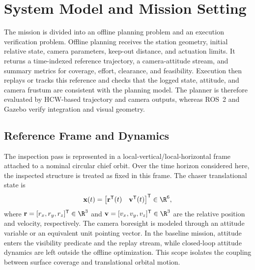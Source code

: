 \section{System Model and Mission Setting}
\label{sec:system}

The mission is divided into an offline planning problem and an execution
verification problem. Offline planning receives the station geometry, initial
relative state, camera parameters, keep-out distance, and actuation limits. It
returns a time-indexed reference trajectory, a camera-attitude stream, and
summary metrics for coverage, effort, clearance, and feasibility. Execution
then replays or tracks this reference and checks that the logged state,
attitude, and camera frustum are consistent with the planning model. The
planner is therefore evaluated by HCW-based trajectory and camera outputs,
whereas ROS~2 and Gazebo verify integration and visual geometry.

\subsection{Reference Frame and Dynamics}

The inspection pass is represented in a local-vertical/local-horizontal frame
attached to a nominal circular chief orbit. Over the time horizon considered
here, the inspected structure is treated as fixed in this frame. The chaser
translational state is
\begin{equation}
  \mathbf{x}(t) =
  \begin{bmatrix}
    \mathbf{r}^{\mathsf T}(t) & \mathbf{v}^{\mathsf T}(t)
  \end{bmatrix}^{\mathsf{T}} \in \R^6,
\end{equation}
where $\mathbf{r}=[r_x,r_y,r_z]^{\mathsf T}\in\R^3$ and
$\mathbf{v}=[v_x,v_y,v_z]^{\mathsf T}\in\R^3$ are the relative position and
velocity, respectively.
The camera boresight is modeled through an attitude variable or an equivalent
unit pointing vector. In the baseline mission, attitude enters the visibility
predicate and the replay stream, while closed-loop attitude dynamics are left
outside the offline optimization. This scope isolates the coupling between
surface coverage and translational orbital motion.

